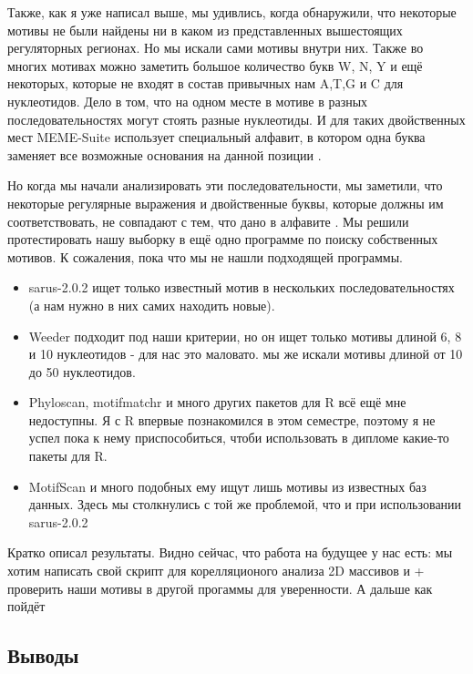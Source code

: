\documentclass[a4paper,12pt]{article}
\begin{document}
    \par{Также, как я уже написал выше, мы удивлись, когда обнаружили, что некоторые мотивы не были найдены ни в каком из представленных вышестоящих регуляторных регионах. Но мы искали сами мотивы внутри них. Также во многих мотивах можно заметить большое количество букв W, N, Y и ещё некоторых, которые не входят в состав привычных нам A,T,G и C для нуклеотидов. Дело в том, что на одном месте в мотиве в разных последовательностях могут стоять разные нуклеотиды. И для таких двойственных мест MEME-Suite использует специальный алфавит, в котором одна буква заменяет все возможные основания на данной позиции \cite{memealphabet}. }
    
    \par{Но когда мы начали анализировать эти последовательности, мы заметили, что некоторые регулярные выражения и двойственные буквы, которые должны им соответствовать, не совпадают с тем, что дано в алфавите \cite{memealphabet}. Мы решили протестировать нашу выборку в ещё одно программе по поиску собственных мотивов. К сожаления, пока что мы не нашли подходящей программы.
    \begin{itemize}
        \item sarus-2.0.2 ищет только известный мотив в нескольких последовательностях (а нам нужно в них самих находить новые). 
        \item Weeder подходит под наши критерии, но он ищет только мотивы длиной 6, 8 и 10 нуклеотидов - для нас это маловато. мы же искали мотивы длиной от 10 до 50 нуклеотидов.
        \item Phyloscan, motifmatchr и много других пакетов для R всё ещё мне недоступны. Я с R впервые познакомился в этом семестре, поэтому я не успел пока к нему приспособиться, чтоби использовать в дипломе какие-то пакеты для R.
        \item MotifScan и много подобных ему ищут лишь мотивы из известных баз данных. Здесь мы столкнулись с той же проблемой, что и при использовании sarus-2.0.2
    \end{itemize}
    }
    
    \par{Кратко описал результаты. Видно сейчас, что работа на будущее у нас есть: мы хотим написать свой скрипт для корелляционого анализа 2D массивов и + проверить наши мотивы в другой прогаммы для уверенности. А дальше как пойдёт}
    
\newpage
\begin{center}
\item \section{Выводы}
\end{center}
\end{document}
